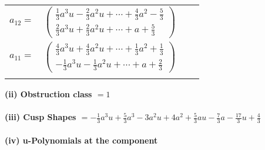 \documentclass[1p]{elsarticle_modified}
\theoremstyle{definition}
\begin{document}
\begin{tabular}{m{7pt} m{180pt} m{7pt} m{180pt} }
\flushright $a_{12}=$&$\begin{pmatrix}\frac{1}{3} a^3 u-\frac{2}{3} a^2 u+\cdots+\frac{4}{3} a^2-\frac{5}{3}\\\frac{2}{3} a^3 u+\frac{2}{3} a^2 u+\cdots+a+\frac{5}{3}\end{pmatrix}$ \\
\flushright $a_{11}=$&$\begin{pmatrix}\frac{4}{3} a^3 u+\frac{4}{3} a^2 u+\cdots+\frac{1}{3} a^2+\frac{1}{3}\\-\frac{1}{3} a^3 u-\frac{1}{3} a^2 u+\cdots+a+\frac{2}{3}\end{pmatrix}$\\&\end{tabular}
\flushleft \textbf{(ii) Obstruction class $= 1$}\\~\\
\flushleft \textbf{(iii) Cusp Shapes $= -\frac{1}{3} a^3 u+\frac{5}{3} a^3-3 a^2 u+4 a^2+\frac{5}{3} a u-\frac{7}{3} a-\frac{17}{3} u+\frac{4}{3}$}\\~\\
\newpage\renewcommand{\arraystretch}{1}
\flushleft \textbf{(iv) u-Polynomials at the component}\newline \\
\end{document}
